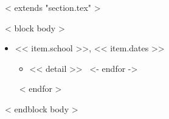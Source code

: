 ~< extends "section.tex" >~


~< block body >~
  \begin{itemize}
    ~< for item in items >~
      \item << item.school >>, \hfill << item.dates >>
      \begin{itemize}
        ~< for detail in item.details ->~
          \item << detail >> 
        ~<- endfor ->~
      \end{itemize}
    ~< endfor >~
  \end{itemize}
~< endblock body >~
